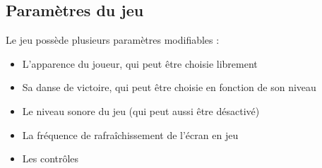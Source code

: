 \subsection{Paramètres du jeu}

    Le jeu possède plusieurs paramètres modifiables : 
    \begin{itemize}
        \item L'apparence du joueur, qui peut être choisie librement
        \item Sa danse de victoire, qui peut être choisie en fonction de son niveau
        \item Le niveau sonore du jeu (qui peut aussi être désactivé)
        \item La fréquence de rafraîchissement de l'écran en jeu
        \item Les contrôles
    \end{itemize}